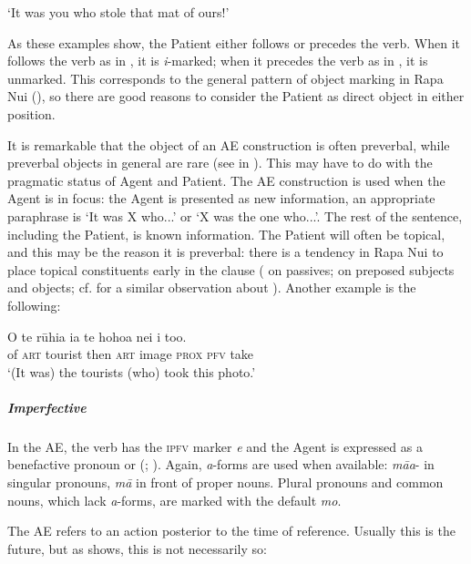\glt
‘It was you who stole that mat of ours!’ \textstyleExampleref{[R310.428]} 
\z

As these examples show, the Patient either follows or precedes the verb. When it follows the verb as in , it is \textit{i}{}-marked; when it precedes the verb as in , it is unmarked. This corresponds to the general pattern of object marking in Rapa Nui (), so there are good reasons to consider the Patient as direct object in either position.

It is remarkable that the object of an AE construction is often preverbal, while preverbal objects in general are rare (see  in ). This may have to do with the pragmatic status of Agent and Patient. The AE construction is used when the Agent is in focus: the Agent is presented as new information, an appropriate paraphrase is ‘It was X who...’ or ‘X was the one who...’. The rest of the sentence, including the Patient, is known information. The Patient will often be topical, and this may be the reason it is preverbal: there is a tendency in Rapa Nui to place topical constituents early in the clause ( on passives;  on preposed subjects and objects; cf. \citet[68]{PotsdamPolinsky2012} for a similar observation about ). Another example is the following: 

\ea\label{ex:8.98}
\gll O te rūhia ia te hoho{\ꞌ}a nei i to{\ꞌ}o. \\
of \textsc{art} tourist then \textsc{art} image \textsc{prox} \textsc{pfv} take \\

\glt 
‘(It was) the tourists (who) took this photo.’ \textstyleExampleref{[R415.735]} 
\z

\subparagraph{Imperfective} In the  AE, the verb has the \textsc{ipfv} marker \textit{e} and the Agent is expressed as a benefactive pronoun or  (; ). Again, \textit{a}{}-forms are used when available: \textit{mā{\ꞌ}a}{}- in singular pronouns, \textit{mā} in front of proper nouns. Plural pronouns and common nouns, which lack \textit{a}{}-forms, are marked with the default \textit{mo}. 

The  AE refers to an action posterior to the time of reference. Usually this is the future, but as  shows, this is not necessarily so:

